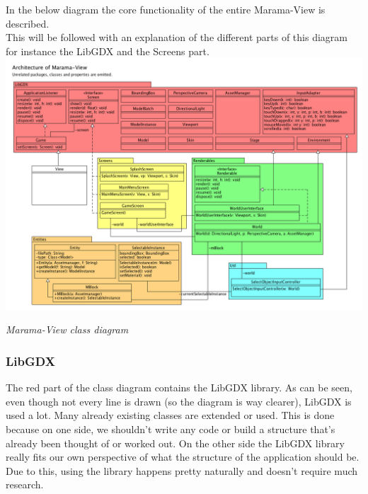 \documentclass[10pt]{extarticle} %
\begin{document}
    In the below diagram the core functionality of the entire Marama-View is described.\\
    This will be followed with an explanation of the different parts of this diagram for instance the LibGDX and the Screens part. \\
    \includegraphics[width=1\linewidth]{architecture-marama-view.png}

    \emph{Marama-View class diagram} \\
    \subsubsection[LibGDX]{LibGDX}
    The red part of the class diagram contains the LibGDX library.
    As can be seen, even though not every line is drawn (so the diagram is way clearer), LibGDX is used a lot.
    Many already existing classes are extended or used.
    This is done because on one side, we shouldn't write any code or build a structure that's already been thought of or worked out.
    On the other side the LibGDX library really fits our own perspective of what the structure of the application should be.
    Due to this, using the library happens pretty naturally and doesn't require much research.
\end{document}

